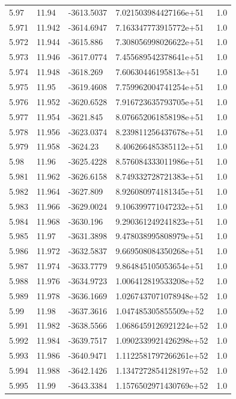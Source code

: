 \begin{tabular}{lllll}
5.97 & 11.94 & -3613.5037 & 7.021503984427166e+51 & 1.0 \\
5.971 & 11.942 & -3614.6947 & 7.163347773915772e+51 & 1.0 \\
5.972 & 11.944 & -3615.886 & 7.308056998026622e+51 & 1.0 \\
5.973 & 11.946 & -3617.0774 & 7.455689542378641e+51 & 1.0 \\
5.974 & 11.948 & -3618.269 & 7.60630446195813e+51 & 1.0 \\
5.975 & 11.95 & -3619.4608 & 7.759962004741254e+51 & 1.0 \\
5.976 & 11.952 & -3620.6528 & 7.916723635793705e+51 & 1.0 \\
5.977 & 11.954 & -3621.845 & 8.076652061858198e+51 & 1.0 \\
5.978 & 11.956 & -3623.0374 & 8.239811256437678e+51 & 1.0 \\
5.979 & 11.958 & -3624.23 & 8.406266485385112e+51 & 1.0 \\
5.98 & 11.96 & -3625.4228 & 8.576084333011986e+51 & 1.0 \\
5.981 & 11.962 & -3626.6158 & 8.749332728721383e+51 & 1.0 \\
5.982 & 11.964 & -3627.809 & 8.926080974181345e+51 & 1.0 \\
5.983 & 11.966 & -3629.0024 & 9.106399771047232e+51 & 1.0 \\
5.984 & 11.968 & -3630.196 & 9.290361249241823e+51 & 1.0 \\
5.985 & 11.97 & -3631.3898 & 9.478038995808979e+51 & 1.0 \\
5.986 & 11.972 & -3632.5837 & 9.669508084350268e+51 & 1.0 \\
5.987 & 11.974 & -3633.7779 & 9.864845105053654e+51 & 1.0 \\
5.988 & 11.976 & -3634.9723 & 1.006412819533208e+52 & 1.0 \\
5.989 & 11.978 & -3636.1669 & 1.0267437071078948e+52 & 1.0 \\
5.99 & 11.98 & -3637.3616 & 1.047485305855509e+52 & 1.0 \\
5.991 & 11.982 & -3638.5566 & 1.0686459126921224e+52 & 1.0 \\
5.992 & 11.984 & -3639.7517 & 1.0902339921426298e+52 & 1.0 \\
5.993 & 11.986 & -3640.9471 & 1.1122581797266261e+52 & 1.0 \\
5.994 & 11.988 & -3642.1426 & 1.1347272854128197e+52 & 1.0 \\
5.995 & 11.99 & -3643.3384 & 1.1576502971430769e+52 & 1.0 \\

\end{tabular}
